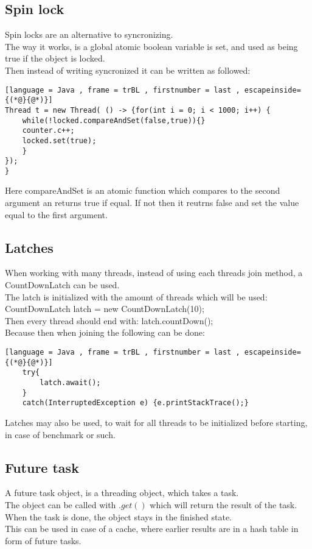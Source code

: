 \documentclass[12pt, a4paper]{article}
\begin{document}
		\subsection{Spin lock}
			Spin locks are an alternative to syncronizing.\\
			The way it works, is a global atomic boolean variable is set, and used as being true if the object is locked.\\
			Then instead of writing syncronized it can be written as followed:
	\begin{lstlisting}[language = Java , frame = trBL , firstnumber = last , escapeinside={(*@}{@*)}]
Thread t = new Thread( () -> {for(int i = 0; i < 1000; i++) {
	while(!locked.compareAndSet(false,true)){}
	counter.c++;
	locked.set(true);
	}
});
}
\end{lstlisting}
			Here compareAndSet is an atomic function which compares to the second argument an returns true if equal. If not then it reutrns false and set the value equal to the first argument.\\
			
		\subsection{Latches}
			When working with many threads, instead of using each threads join method, a CountDownLatch can be used.\\
			The latch is initialized with the amount of threads which will be used: CountDownLatch latch = new CountDownLatch(10);\\
			Then every thread should end with: latch.countDown();\\
			Because then when joining the following can be done:
	\begin{lstlisting}[language = Java , frame = trBL , firstnumber = last , escapeinside={(*@}{@*)}]
	try{
		latch.await();
	}
	catch(InterruptedException e) {e.printStackTrace();}
\end{lstlisting}
			Latches may also be used, to wait for all threads to be initialized before starting, in case of benchmark or such.\\
		\subsection{Future task}
			A future task object, is a threading object, which takes a task.\\
			The object can be called with $.get()$ which will return the result of the task.\\
			When the task is done, the object stays in the finished state.\\
			This can be used in case of a cache, where earlier results are in a hash table in form of future tasks.
\end{document}

